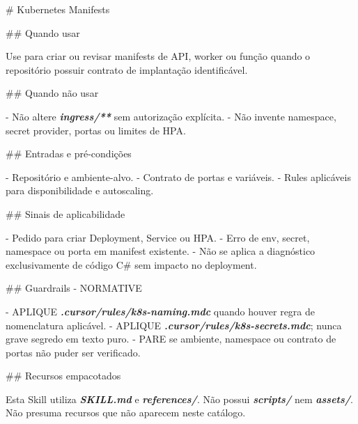 \documentclass[
  10pt,
  a4paper,
  oneside]{book}
\newenvironment{Shaded}{}{}
\newcommand{\FunctionTok}[1]{\textcolor[rgb]{0.02,0.16,0.49}{#1}}
\newcommand{\InformationTok}[1]{\textcolor[rgb]{0.38,0.63,0.69}{\textbf{\textit{#1}}}}
\newcommand{\NormalTok}[1]{#1}
\newcommand{\SpecialStringTok}[1]{\textcolor[rgb]{0.73,0.40,0.53}{#1}}
\renewenvironment{Shaded}{\begin{snugshade}}{\end{snugshade}}%
\begin{document}
\begin{Shaded}
\begin{Highlighting}[]
\FunctionTok{\# Kubernetes Manifests}

\FunctionTok{\#\# Quando usar}

\NormalTok{Use para criar ou revisar manifests de API, worker ou função quando o}
\NormalTok{repositório possuir contrato de implantação identificável.}

\FunctionTok{\#\# Quando não usar}

\SpecialStringTok{{-} }\NormalTok{Não altere }\InformationTok{\textasciigrave{}ingress/**\textasciigrave{}}\NormalTok{ sem autorização explícita.}
\SpecialStringTok{{-} }\NormalTok{Não invente namespace, secret provider, portas ou limites de HPA.}

\FunctionTok{\#\# Entradas e pré{-}condições}

\SpecialStringTok{{-} }\NormalTok{Repositório e ambiente{-}alvo.}
\SpecialStringTok{{-} }\NormalTok{Contrato de portas e variáveis.}
\SpecialStringTok{{-} }\NormalTok{Rules aplicáveis para disponibilidade e autoscaling.}

\FunctionTok{\#\# Sinais de aplicabilidade}

\SpecialStringTok{{-} }\NormalTok{Pedido para criar Deployment, Service ou HPA.}
\SpecialStringTok{{-} }\NormalTok{Erro de env, secret, namespace ou porta em manifest existente.}
\SpecialStringTok{{-} }\NormalTok{Não se aplica a diagnóstico exclusivamente de código C\# sem impacto no deployment.}

\FunctionTok{\#\# Guardrails {-} NORMATIVE}

\SpecialStringTok{{-} }\NormalTok{APLIQUE }\InformationTok{\textasciigrave{}.cursor/rules/k8s{-}naming.mdc\textasciigrave{}}\NormalTok{ quando houver regra de nomenclatura aplicável.}
\SpecialStringTok{{-} }\NormalTok{APLIQUE }\InformationTok{\textasciigrave{}.cursor/rules/k8s{-}secrets.mdc\textasciigrave{}}\NormalTok{; nunca grave segredo em texto puro.}
\SpecialStringTok{{-} }\NormalTok{PARE se ambiente, namespace ou contrato de portas não puder ser verificado.}

\FunctionTok{\#\# Recursos empacotados}

\NormalTok{Esta Skill utiliza }\InformationTok{\textasciigrave{}SKILL.md\textasciigrave{}}\NormalTok{ e }\InformationTok{\textasciigrave{}references/\textasciigrave{}}\NormalTok{. Não possui }\InformationTok{\textasciigrave{}scripts/\textasciigrave{}}\NormalTok{ nem }\InformationTok{\textasciigrave{}assets/\textasciigrave{}}\NormalTok{.}
\NormalTok{Não presuma recursos que não aparecem neste catálogo.}


\end{Highlighting}
\end{Shaded}
\end{document}
